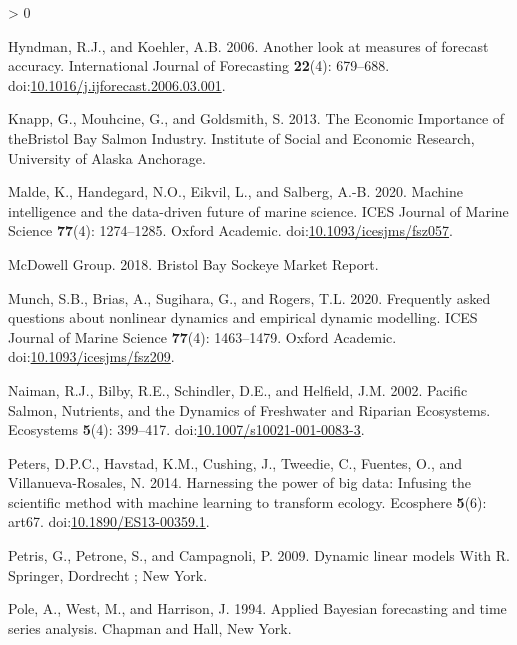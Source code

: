 \documentclass[
]{article}
\newlength{\cslhangindent}
\newenvironment{CSLReferences}[2] %
 {%
  \setlength{\parindent}{0pt}
  \ifodd #1 \everypar{\setlength{\hangindent}{\cslhangindent}}\ignorespaces\fi
  \ifnum #2 > 0
  \setlength{\parskip}{#2\baselineskip}
  \fi
 }%
 {}
\begin{document}
\begin{CSLReferences}{1}{0}
\leavevmode\hypertarget{ref-hyndman2006}{}%
Hyndman, R.J., and Koehler, A.B. 2006. Another look at measures of forecast accuracy. International Journal of Forecasting \textbf{22}(4): 679--688. doi:\href{https://doi.org/10.1016/j.ijforecast.2006.03.001}{10.1016/j.ijforecast.2006.03.001}.

\leavevmode\hypertarget{ref-knapp2013}{}%
Knapp, G., Mouhcine, G., and Goldsmith, S. 2013. The {Economic Importance} of {theBristol Bay Salmon Industry}. {Institute of Social and Economic Research}, {University of Alaska Anchorage}.

\leavevmode\hypertarget{ref-malde2020}{}%
Malde, K., Handegard, N.O., Eikvil, L., and Salberg, A.-B. 2020. Machine intelligence and the data-driven future of marine science. ICES Journal of Marine Science \textbf{77}(4): 1274--1285. {Oxford Academic}. doi:\href{https://doi.org/10.1093/icesjms/fsz057}{10.1093/icesjms/fsz057}.

\leavevmode\hypertarget{ref-mcdowellgroup2018}{}%
McDowell Group. 2018. Bristol {Bay Sockeye Market Report}.

\leavevmode\hypertarget{ref-munch2020}{}%
Munch, S.B., Brias, A., Sugihara, G., and Rogers, T.L. 2020. Frequently asked questions about nonlinear dynamics and empirical dynamic modelling. ICES Journal of Marine Science \textbf{77}(4): 1463--1479. {Oxford Academic}. doi:\href{https://doi.org/10.1093/icesjms/fsz209}{10.1093/icesjms/fsz209}.

\leavevmode\hypertarget{ref-naiman2002}{}%
Naiman, R.J., Bilby, R.E., Schindler, D.E., and Helfield, J.M. 2002. Pacific {Salmon}, {Nutrients}, and the {Dynamics} of {Freshwater} and {Riparian Ecosystems}. Ecosystems \textbf{5}(4): 399--417. doi:\href{https://doi.org/10.1007/s10021-001-0083-3}{10.1007/s10021-001-0083-3}.

\leavevmode\hypertarget{ref-peters2014}{}%
Peters, D.P.C., Havstad, K.M., Cushing, J., Tweedie, C., Fuentes, O., and Villanueva-Rosales, N. 2014. Harnessing the power of big data: Infusing the scientific method with machine learning to transform ecology. Ecosphere \textbf{5}(6): art67. doi:\href{https://doi.org/10.1890/ES13-00359.1}{10.1890/ES13-00359.1}.

\leavevmode\hypertarget{ref-petris2009}{}%
Petris, G., Petrone, S., and Campagnoli, P. 2009. Dynamic linear models {With R}. {Springer}, {Dordrecht ; New York}.

\leavevmode\hypertarget{ref-pole1994}{}%
Pole, A., West, M., and Harrison, J. 1994. Applied {Bayesian} forecasting and time series analysis. {Chapman and Hall}, {New York}.


\end{CSLReferences}
\end{document}
